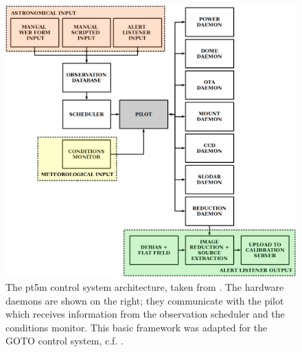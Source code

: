 \begin{colsection}
\begin{colsection}
\begin{figure}[p]
    \begin{center}
        \includegraphics[width=\linewidth]{images/pt5m_software.png}
    \end{center}
    \caption[The pt5m control system architecture]{
        The pt5m control system architecture, taken from \citet{pt5m}. The hardware daemons are shown on the right; they communicate with the pilot which receives information from the observation scheduler and the conditions monitor. This basic framework was adapted for the GOTO control system, c.f. .
    }\label{fig:pt5m_software}
\end{figure}

\end{colsection}


\end{colsection}


\newpage
